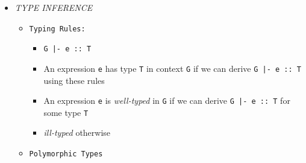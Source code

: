 \documentclass[landscape,8pt]{extarticle}
\newcommand{\code}{\lstinline}
\begin{document}
\begin{multicols}{3}
\begin{itemize}
\begin{lstlisting}
TRUE    = \x y -> x
FALSE   = \x y -> y
ITE     = \b x y -> b x y
AND     = \b1 b2 -> b1 b2 FALSE
OR      = \b1 b2 -> b1 TRUE b2
NOT     = \b1 -> b1 FALSE TRUE
NOR     = \b1 b2 -> NOT (OR b1 b2)
NAND    = \b1 b2 -> NOT (AND b1 b2)
XOR     = \b1 b2 -> AND (NAND b1 b2) (OR b1 b2)

INCR    = \n f x -> f (n f x)

PAIR    = \x y b -> b x y
FST     = \p     -> p TRUE
SND     = \p     -> p FALSE

SKIP1   = \j k -> (\b ->
    b TRUE ((AND TRUE (k(TRUE))) (j(k(FALSE))) (k(FALSE))))
DECR    =  \n -> (n (SKIP1 INCR) (PAIR FALSE ZERO)) FALSE
SUB     = \m n -> (n DECR) m
ISZ     =  \n -> n(\a -> FALSE) TRUE
EQL     = \n m -> AND (ISZ (SUB m n)) (ISZ (SUB n m))
SUC   = \n f x -> f (n f x)
ADD     = \n m -> n SUC m
MUL     = \n m -> n (ADD m) ZERO
REPEAT  = \n m -> n (PAIR m) FALSE
EMPTY   = \p -> p (\x y z -> FALSE) TRUE
FIX     = \stp -> (\x -> stp (x x)) (\x -> stp (x x))
LEN     = FIX (\rec n -> (EMPTY n) ZERO (INCR (rec (SND n))))
STEP    = \rec n -> (ISZ n) ZERO (ADD n (rec (DECR n)))
SUM     = FIX STEP
DIV     = FIX (\rec n m ->
    (EQL n m) ONE ((ISZ (SUB n m) ) ZERO (INCR (rec (SUB n m) m))))
MOD     = FIX (\rec n m ->
    (EQL n m) ZERO ((ISZ (SUB n m) ) n (rec (SUB n m) m)))
INSERT  = \n m -> (PAIR n m)
APPEND' = FIX (\rec n m ->
    (EMPTY n) m (INSERT (FST n) (rec (SND n) m)))
            \end{lstlisting}
        \item \emph{TYPE INFERENCE}
              \begin{itemize}
                  \item \code{Typing Rules:}
                        \begin{itemize}
                            \item \code{G |- e :: T}
                            \item An expression \code{e} has type \code{T} in context \code{G} if we can derive \code{G |- e :: T} using these rules
                            \item An expression \code{e} is \emph{well-typed} in \code{G} if we can derive \code{G |- e :: T} for some type \code{T}
                            \item \emph{ill-typed} otherwise
                        \end{itemize}
                  \item \code{Polymorphic Types}
                        \begin{itemize}

\end{itemize}
\end{itemize}
\end{itemize}
\end{multicols}
\end{document}

